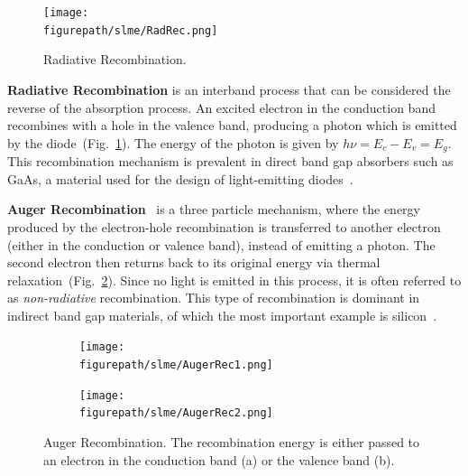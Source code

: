 \begin{refsection}
\begin{figure}
\vspace{-3em}
\centering 
\texttt{[image: \\figurepath/slme/RadRec.png]} 
\caption{\label{slme:fig-radrec} Radiative Recombination.} 
\end{figure}
\vspace{2em}
\textbf{Radiative Recombination} is an interband process that can be 
considered the reverse of the absorption process. An excited electron in the 
conduction band recombines with a hole in the valence band, producing a photon 
which is emitted by the diode~(Fig.~\ref{slme:fig-radrec}). The energy of the 
photon is given by $h \nu = E_c - E_v = E_g$. This recombination mechanism is 
prevalent in direct band gap absorbers such as GaAs, a material used for the 
design of light-emitting diodes~\cite{Green1981}. 

\pagebreak[4]
\textbf{Auger Recombination}~\cite{Auger1923} is a three particle 
mechanism, where the energy produced by the electron-hole recombination is 
transferred to another electron (either in the conduction or valence band), 
instead of emitting a photon. The second electron then returns back to its 
original energy via thermal relaxation~(Fig.~\ref{slme:fig-augerrec}). Since 
no light is emitted in this process, it is often referred to as 
\textit{non-radiative} recombination. This type of recombination is dominant 
in indirect band gap materials, of which the most important example is 
silicon~\cite{Nilsson1973}. 
\begin{figure}[ht]  
\centering 
\begin{subfigure}{0.50\textwidth} 
\centering 
\texttt{[image: \\figurepath/slme/AugerRec1.png]} 
\caption{} 
\end{subfigure}%
\begin{subfigure}{0.50\textwidth} 
\centering 
\texttt{[image: \\figurepath/slme/AugerRec2.png]} 
\caption{} 
\end{subfigure} 
\caption{\label{slme:fig-augerrec}Auger Recombination. The recombination 
energy is either passed to an electron in the conduction band (a) or the 
valence band (b).} 
\end{figure} 


\end{refsection}
